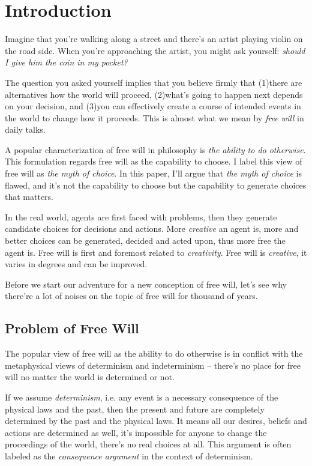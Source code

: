 \section{Introduction}

Imagine that you're walking along a street and there's an artist playing violin on the road side. When you're approaching the artist, you might ask yourself: \emph{should I give him the coin in my pocket?}

The question you asked yourself implies that you believe firmly that (1)there are alternatives how the world will proceed, (2)what's going to happen next depends on your decision, and (3)you can effectively create a course of intended events in the world to change how it proceeds. This is almost what we mean by \emph{free will} in daily talks.

A popular characterization of free will in philosophy is \emph{the ability to do otherwise}\cite{sep-freewill}. This formulation regards free will as the capability to choose. I label this view of free will as \emph{the myth of choice}. In this paper, I'll argue that \emph{the myth of choice} is flawed, and it's not the capability to choose but the capability to generate choices that matters.

In the real world, agents are first faced with problems, then they generate candidate choices for decisions and actions. More \emph{creative} an agent is, more and better choices can be generated, decided and acted upon, thus more free the agent is. Free will is first and foremost related to \emph{creativity}. Free will is \emph{creative}, it varies in degrees and can be improved.

Before we start our adventure for a new conception of free will, let's see why there're a lot of noises on the topic of free will for thousand of years.

\subsection{Problem of Free Will}

The popular view of free will as the ability to do otherwise is in conflict with the metaphysical views of determinism and indeterminism -- there’s no place for free will no matter the world is determined or not.

If we assume \emph{determinism}, i.e. any event is a necessary consequence of the physical laws and the past, then the present and future are completely determined by the past and the physical laws. It means all our desires, beliefs and actions are determined as well, it’s impossible for anyone to change the proceedings of the world, there’s no real choices at all. This argument is often labeled as the \emph{consequence argument} in the context of determinism.

